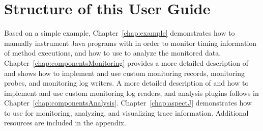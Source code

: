 \section{Structure of this User Guide}

Based on a simple example, Chapter~\ref{chap:example} demonstrates %
how to manually instrument Java programs with \KiekerMonitoringPart{} %
in order to monitor timing information of method executions, and %
how to use \KiekerAnalysisPart{} to analyze the monitored data. %
Chapter~\ref{chap:componentsMonitoring} provides a more detailed %
description of \KiekerMonitoringPart{} and shows how to implement and %
use custom monitoring records, monitoring probes, and monitoring log writers. %
A more detailed description of \KiekerAnalysisPart{} and how to implement and use %
custom monitoring log readers, and analysis plugins follows in %
Chapter~\ref{chap:componentsAnalysis}. %
Chapter~\ref{chap:aspectJ} demonstrates how to use \KiekerTraceAnalysis{} %
for monitoring, analyzing, and visualizing trace information. %
Additional resources are included in the appendix.

\quad\\



